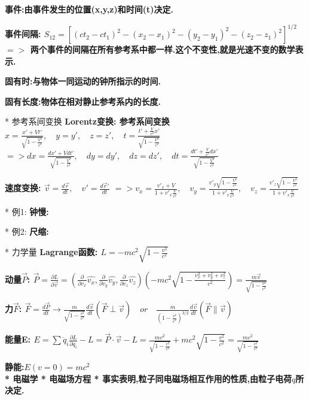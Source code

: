         \bf{事件}:由事件发生的位置(x,y,z)和时间(t)决定.
        
        \bf{事件间隔}:
            $S_{12} = [(ct_2-ct_1)^2 - (x_2-x_1)^2 - (y_2-y_1)^2 - (z_2-z_1)^2]^{1/2}$
            $=>$ 两个事件的间隔在所有参考系中都一样.\quad 这个不变性,就是光速不变的数学表示.
        
        \bf{固有时}:与物体一同运动的钟所指示的时间.
        
        \bf{固有长度}:物体在相对静止参考系内的长度.


    * 参考系间变换
        \bf{Lorentz变换}: 参考系间变换
            $ x = \frac{x' + V t'}{\sqrt{1 - \frac{V^2}{c^2}}},\quad y=y',\quad z=z', \quad t = \frac{t'+ \frac{V}{c^2}x'}{\sqrt{1 - \frac{V^2}{c^2}}}$
            $ => dx = \frac{dx' + V dt'}{\sqrt{1 - \frac{V^2}{c^2}}},\quad dy=dy',\quad dz=dz', \quad dt = \frac{dt'+ \frac{V}{c^2}dx'}{\sqrt{1 - \frac{V^2}{c^2}}}$
    
        \bf{速度变换}: $\vec v = \frac{d\vec r}{dt},\quad v' = \frac{d\vec r'}{dt}$
            $=> v_x = \frac{v'_x + V}{1 + v'_x \frac{V}{c^2}}, \quad v_y = \frac{v'_y \sqrt{1 - \frac{V^2}{c^2}}}{1 + v'_x \frac{V}{c^2}},\quad v_z = \frac{v'_z \sqrt{1 - \frac{V^2}{c^2}}}{1 + v'_x \frac{V}{c^2}}$
            
        * 例1: \bf{钟慢}:
    
        * 例2: \bf{尺缩}:


    * 力学量
        \bf{Lagrange函数}:
            $L = -m c^2 \sqrt{1 - \frac{v^2}{c^2}}$
    
        \bf{动量$\vec P$}:
            $\vec P = \frac{∂ L}{∂ \vec v}= (\frac{∂}{∂ v_x} \hat{v_x}, \frac{∂}{∂ v_y} \hat{v_y}, \frac{∂}{∂ v_z} \hat{v_z})(-m c^2 \sqrt{1 - \frac{v_x^2 + v_y^2 + v_z^2}{c^2}}) = \frac{m \vec v}{\sqrt{1 - \frac{v^2}{c^2}}}$
        
        \bf{力$\vec F$}:
            $\vec F = \frac{d\vec P}{dt} \to \frac{m}{\sqrt{1 - \frac{v^2}{c^2}}} \frac{d\vec v}{dt}(\vec F \perp \vec v) \quad or\quad  \frac{m}{(1 - \frac{v^2}{c^2})^{3/2}} \frac{d\vec v}{dt} (\vec F \parallel \vec v)$
    
        \bf{能量E}:
            $E = \sum \dot q_i \frac{∂ L}{∂ \dot q_i} - L = \vec P \cdot \vec v - L = \frac{m v^2}{\sqrt{1 - \frac{v^2}{c^2}}} + m c^2 \sqrt{1 - \frac{v^2}{c^2}} = \frac{mc^2}{\sqrt{1 - \frac{v^2}{c^2}}}$
    
        \bf{静能}:\quad $E(v=0) = m c^2$\\


* 电磁学
    * 电磁场方程
        * 事实表明,粒子同电磁场相互作用的性质,由粒子电荷$q$所决定.
    
